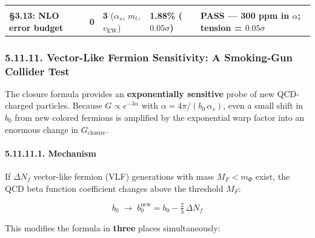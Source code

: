 \documentclass[
  11pt,
]{article}
\begin{document}
\begin{longtable}[]{@{}lllll@{}}
\begin{minipage}[t]{0.17\columnwidth}
\end{minipage}\tabularnewline
\begin{minipage}[t]{0.17\columnwidth}\raggedright
\textbf{§3.13: NLO error budget}\strut
\end{minipage} & \begin{minipage}[t]{0.17\columnwidth}\raggedright
\textbf{0}\strut
\end{minipage} & \begin{minipage}[t]{0.17\columnwidth}\raggedright
\textbf{3} (\(\alpha_s\), \(m_t\), \(v_{\text{EW}}\))\strut
\end{minipage} & \begin{minipage}[t]{0.17\columnwidth}\raggedright
\textbf{1.88\% (\(0.05\sigma\))}\strut
\end{minipage} & \begin{minipage}[t]{0.17\columnwidth}\raggedright
\textbf{PASS --- 300 ppm in \(\alpha\); tension = \(0.05\sigma\)}\strut
\end{minipage}\tabularnewline
\bottomrule
\end{longtable}

\hypertarget{vector-like-fermion-sensitivity-a-smoking-gun-collider-test}{%
\subsubsection{5.11.11. Vector-Like Fermion Sensitivity: A Smoking-Gun
Collider
Test}\label{vector-like-fermion-sensitivity-a-smoking-gun-collider-test}}

The closure formula provides an \textbf{exponentially sensitive} probe
of new QCD-charged particles. Because \(G \propto e^{-3\alpha}\) with
\(\alpha = 4\pi/(b_0\,\alpha_s)\), even a small shift in \(b_0\) from
new colored fermions is amplified by the exponential warp factor into an
enormous change in \(G_{\text{closure}}\).

\hypertarget{mechanism}{%
\paragraph{5.11.11.1. Mechanism}\label{mechanism}}

If \(\Delta N_f\) vector-like fermion (VLF) generations with mass
\(M_F < m_\Phi\) exist, the QCD beta function coefficient changes above
the threshold \(M_F\):

\[b_0 \;\to\; b_0^{\text{new}} = b_0 - \tfrac{2}{3}\,\Delta N_f \tag{265}\]

This modifies the formula in \textbf{three} places simultaneously:
\end{document}
